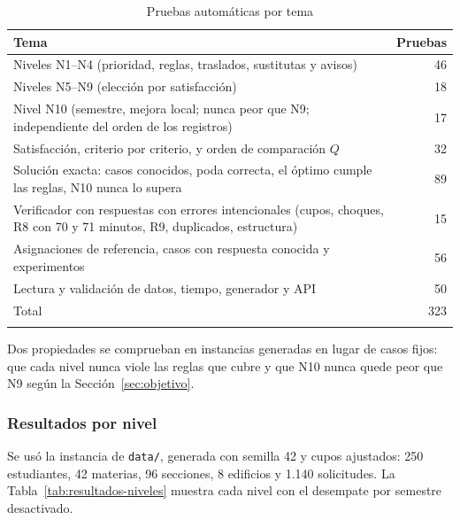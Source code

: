 \begin{table}[htbp]
\caption{Pruebas automáticas por tema}\label{tab:pruebas}
\small
\begin{tabularx}{\textwidth}{@{}Lr@{}}
\toprule
Tema & Pruebas \\
\midrule
Niveles N1--N4 (prioridad, reglas, traslados, sustitutas y avisos) & 46 \\
Niveles N5--N9 (elección por satisfacción) & 18 \\
Nivel N10 (semestre, mejora local; nunca peor que N9; independiente del orden de los registros) & 17 \\
Satisfacción, criterio por criterio, y orden de comparación $Q$ & 32 \\
Solución exacta: casos conocidos, poda correcta, el óptimo cumple las reglas, N10 nunca lo supera & 89 \\
Verificador con respuestas con errores intencionales (cupos, choques, R8 con 70 y 71 minutos, R9, duplicados, estructura) & 15 \\
Asignaciones de referencia, casos con respuesta conocida y experimentos & 56 \\
Lectura y validación de datos, tiempo, generador y API & 50 \\
\midrule
Total & 323 \\
\botrule
\end{tabularx}
\end{table}

Dos propiedades se comprueban en instancias generadas en lugar de casos fijos: que cada nivel nunca viole las reglas que cubre y que N10 nunca quede peor que N9 según la Sección~\ref{sec:objetivo}.

\subsubsection{Resultados por nivel}

Se usó la instancia de \texttt{data/}, generada con semilla 42 y cupos ajustados: 250 estudiantes, 42 materias, 96 secciones, 8 edificios y 1.140 solicitudes. La Tabla~\ref{tab:resultados-niveles} muestra cada nivel con el desempate por semestre desactivado.

